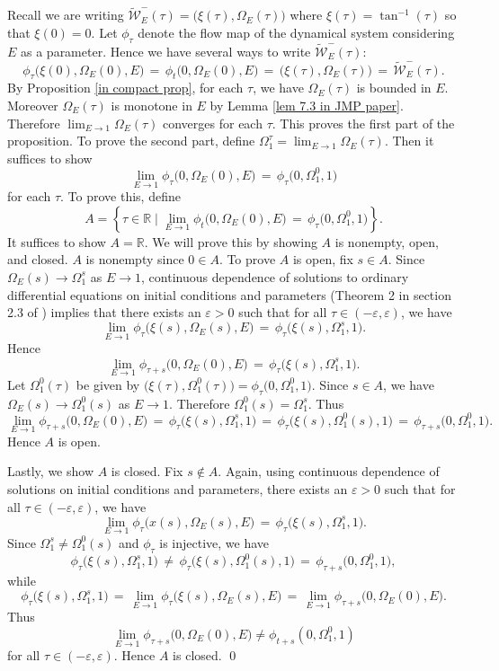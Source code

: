 \documentclass[11 pt]{article}
\renewcommand\({\left(}
\renewcommand\){\right)}
\newcommand\wt{\widetilde}
\newcommand\e{\varepsilon}
\newcommand\<{\langle}
\renewcommand\>{\rangle}
\newcommand\8{\infty}
\newcommand{\R}{\mathbb R}
\newcommand{\mc}{\mathcal}
\begin{document}
\proof
Recall we are writing $\wt{\mc{W}}_E^-(\tau) = \big(\xi(\tau), \Omega_E(\tau)\big)$ where $\xi(\tau) = \tan^{-1}(\tau)$ so that $\xi(0) = 0$. Let $\phi_\tau$ denote the flow map of the dynamical system considering $E$ as a parameter. Hence we have several ways to write $\wt{\mc{W}}_E^-(\tau)$:
\[
\phi_\tau\big(\xi(0), \Omega_E(0), E \big) \,=\, \phi_t\big(0, \Omega_E(0), E\big) \,=\, \big(\xi(\tau), \Omega_E(\tau)\big) \,=\, \wt{\mc{W}}_E^-(\tau).
\]
By Proposition \ref{in compact prop}, for each $\tau$, we have $\Omega_E(\tau)$ is bounded in $E$. Moreover $\Omega_E(\tau)$ is monotone in $E$ by Lemma \ref{lem 7.3 in JMP paper}. Therefore $\lim_{E \to 1}\Omega_E(\tau)$ converges for each $\tau$. This proves the first part of the proposition. To prove the second part, define $\Omega^\tau_1 = \lim_{E \to 1}\Omega_E(\tau)$. Then it suffices to show 
\[
\lim_{E \to 1}\phi_\tau\big(0, \Omega_E(0), E\big) \,=\, \phi_\tau\big(0, \Omega_1^0, 1\big)
\]
for each $\tau$. To prove this, define 
\[
A = \left\{\tau \in \R \mid \lim_{E \to 1}\phi_t\big(0, \Omega_E(0), E\big) \,=\, \phi_\tau\big(0, \Omega_1^0, 1\big) \right\}. 
\]
It suffices to show $A = \R$. We will prove this by showing $A$ is nonempty, open, and closed. $A$ is nonempty since $0 \in A$. To prove $A$ is open, fix $s \in A$. Since $\Omega_E(s) \to \Omega_1^s$ as $E \to 1$, continuous dependence of solutions to ordinary differential equations on initial conditions and parameters (Theorem 2 in section 2.3 of \cite{Perko}) implies that there exists an $\e > 0$ such that for all $\tau \in (-\e, \e)$, we have
\[
\lim_{E \to 1}\phi_\tau\big(\xi(s), \Omega_E(s), E \big) \,=\, \phi_\tau\big(\xi(s), \Omega_1^s, 1\big). 
\]
Hence
\[
\lim_{E \to 1}\phi_{\tau+s}\big(0, \Omega_E(0), E\big) \,=\, \phi_\tau\big(\xi(s), \Omega_1^s, 1\big). 
\]
Let $\Omega^0_1(\tau)$ be given by $\big(\xi(\tau), \Omega_1^0(\tau)\big) = \phi_\tau\big(0, \Omega_1^0, 1\big)$. Since $s \in A$, we have $\Omega_E(s) \to \Omega_1^0(s)$ as $E \to 1$. Therefore $\Omega^0_1(s) = \Omega^s_1$. Thus
\[
\lim_{E \to 1}\phi_{\tau+s}\big(0, \Omega_E(0), E \big) \,=\, \phi_\tau\big(\xi(s), \Omega_1^s, 1\big) \,=\, \phi_\tau\big(\xi(s), \Omega^0_1(s), 1\big) \,=\, \phi_{\tau + s}\big(0, \Omega_1^0, 1\big). 
\]
Hence $A$ is open.  

Lastly, we show $A$ is closed. Fix $s \notin A$. Again, using continuous dependence of solutions on initial conditions and parameters, there exists an $\e > 0$ such that for all $\tau \in (-\e, \e)$, we have 
\[
\lim_{E \to 1}\phi_\tau\big(x(s), \Omega_E(s), E\big) \,=\, \phi_\tau\big(\xi(s), \Omega_1^s, 1\big). 
\]
Since $\Omega_1^s \neq \Omega^0_1(s)$ and $\phi_\tau$ is injective, we have 
\[
\phi_\tau\big(\xi(s), \Omega_1^s, 1\big) \,\neq\, \phi_\tau\big(\xi(s), \Omega^0_1(s), 1\big) \,=\, \phi_{\tau+s}\big(0, \Omega^0_1, 1\big),
\]
while
\[
\phi_\tau\big(\xi(s), \Omega_1^s, 1\big) \,=\, \lim_{E \to 1}\phi_\tau\big(\xi(s), \Omega_E(s), E\big) \,=\, \lim_{E \to 1}\phi_{\tau + s}\big(0, \Omega_{E}(0), E\big). 
\]
Thus 
\[
\lim_{E \to 1}\phi_{\tau+s}\big(0, \Omega_E(0), E\big) \neq \phi_{t + s}(0, \Omega_1^0, 1)
\]
for all $\tau \in (-\e, \e)$. Hence $A$ is closed. 
\qed
\end{document}
